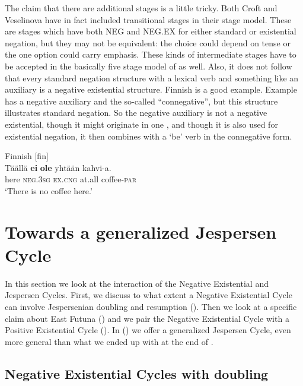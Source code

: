 ﻿\documentclass[output=paper]{langsci/langscibook}
\begin{document}
The claim that there are additional stages is a little tricky. Both Croft
and Veselinova have in fact included transitional stages in their stage
model. These are stages which have both NEG and NEG.EX for either standard
or existential negation, but they may not be equivalent: the choice could
depend on tense or the one option could carry emphasis. These kinds of
intermediate stages have to be accepted in the basically five stage model
of  as well. Also, it does not follow that every standard
negation structure with a lexical verb and something like an auxiliary is a
negative existential structure. Finnish is a good example. Example
 has a negative auxiliary and the so-called ``connegative'',
but this structure illustrates standard negation. So the negative auxiliary
is not a negative existential, though it might originate in one
\parencite[see][577 for references]{Veselinova2015}, and though it is also
used
for existential negation, it then combines with a `be' verb in the
connegative form.
%
\begin{exe}\ex\label{ex:int-finnish-kahvi}
          Finnish [fin] \\
    \gll Täällä  \textbf{ei}    \textbf{ole}    yhtään   kahvi-a.  \\
  here  \textsc{neg.3sg}  \textsc{ex.cng}  at.all    coffee-\textsc{par} \\
    \glt `There is no coffee here.'
    \end{exe} 

\section{Towards a generalized Jespersen Cycle}\label{sec:int-4}

In this section we look at the interaction of the Negative Existential and
Jespersen Cycles. First, we discuss to what extent a Negative Existential
Cycle can involve Jespersenian doubling and resumption
(). Then we look
at a specific claim about East Futuna () and we pair the Negative
Existential Cycle with a Positive Existential Cycle
(). In () we
offer a generalized Jespersen Cycle, even more general than what we ended
up with at the end of .

\subsection{Negative Existential Cycles with doubling}\label{sec:int-4.1}
\end{document}
